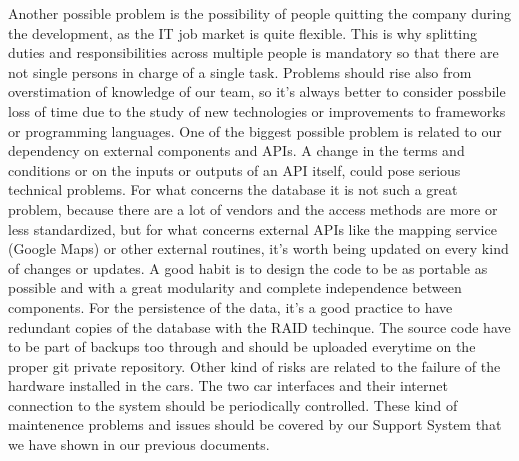 \clearpage

Another possible problem is the possibility of people quitting the company during the development, as the IT job market is quite flexible. This is why splitting duties and responsibilities across multiple people is mandatory so that there are not single persons in charge of a single task.
Problems should rise also from overstimation of knowledge of our team, so it's always better to consider possbile loss of time due to the study of new technologies or improvements to frameworks or programming languages.
\newline
One of the biggest possible problem is related to our dependency on external components and APIs. 
A change in the terms and conditions or on the inputs or outputs of an API itself, could pose serious technical problems. For what concerns the database it is not such a great problem, because there are a lot of  vendors and the access methods are more or less standardized, but for what concerns external APIs like the mapping service (Google Maps) or other external routines, it's worth being updated on every kind of changes or updates.
\newline
A good habit is to design the code to be as portable as possible and with a great modularity and complete independence between components.
\newline
\newline
For the persistence of the data, it's a good practice to have redundant copies of the database with the RAID techinque.
The source code have to be part of backups too through and should be uploaded everytime on the proper git private repository.
Other kind of risks are related to the failure of the hardware installed in the cars.
The two car interfaces and their internet connection to the system should be periodically controlled. These kind of maintenence problems and issues should be covered by our Support System that we have shown in our previous documents.